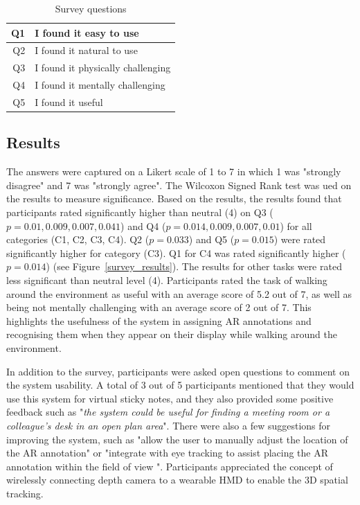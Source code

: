 \begin{table}[ht]
  \centering
	\caption{Survey questions}
    \label{table:questions}
    \begin{tabular}{r l}
    \hline
    Q1 & I found it easy to use \\ \hline
    Q2 & I found it natural to use \\ \hline
    Q3 & I found it physically challenging \\ \hline
    Q4 & I found it mentally challenging \\ \hline
    Q5 & I found it useful \\ \hline
    \end{tabular}
\end{table}

\subsection{Results}

The answers were captured on a Likert scale of 1 to 7 in which 1 was "strongly disagree" and 7 was "strongly agree". The Wilcoxon Signed Rank test was ued on the results to measure significance. Based on the results, the results found that participants rated significantly higher than neutral (4) on Q3 ($p=0.01, 0.009, 0.007, 0.041$) and Q4 ($p=0.014, 0.009, 0.007, 0.01$) for all categories (C1, C2, C3, C4). Q2 ($p=0.033$) and Q5 ($p=0.015$) were rated significantly higher for category (C3). Q1 for C4 was rated significantly higher ($p=0.014$) (see Figure~\ref{survey_results}). The results  for other tasks were rated less significant than neutral level (4). Participants rated the task of walking around the environment as useful with an average score of 5.2 out of 7, as well as being not mentally challenging with an average score of 2 out of 7. This highlights the usefulness of the system in assigning AR annotations and recognising them when they appear on their display while walking around the environment. 

In addition to the survey, participants were asked open questions to comment on the system usability. A total of 3 out of 5 participants mentioned that they would use this system for virtual sticky notes, and they also provided some positive feedback such as "\textit{the system could be useful for finding a meeting room or a colleague's desk in an open plan area}". There were also a few suggestions for improving the system, such as "allow the user to manually adjust the location of the AR annotation" or "integrate with eye tracking to assist placing the AR annotation within the field of view ". Participants appreciated  the concept of wirelessly connecting depth camera to a wearable HMD to enable the 3D spatial tracking.    


